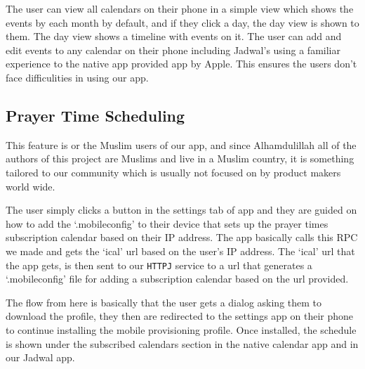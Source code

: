 The user can view all calendars on their phone in a simple view which shows the events by each month by default, and if they click a day, the day view is shown to them. The day view shows a timeline with events on it. The user can add and edit events to any calendar on their phone including Jadwal's using a familiar experience to the native app provided app by Apple. This ensures the users don't face difficulities in using our app.

\subsection{Prayer Time Scheduling}
\label{subsec:schedule-prayer-times}
This feature is or the Muslim users of our app, and since Alhamdulillah all of the authors of this project are Muslims and live in a Muslim country, it is something tailored to our community which is usually not focused on by product makers world wide.

The user simply clicks a button in the settings tab of app and they are guided on how to add the `.mobileconfig' to their device that sets up the prayer times subscription calendar based on their IP address. The app basically calls this RPC we made and gets the `ical' url based on the user's IP address. The `ical' url that the app gets, is then sent to our \texttt{HTTPJ} service to a url that generates a `.mobileconfig' file for adding a subscription calendar based on the url provided.

The flow from here is basically that the user gets a dialog asking them to download the profile, they then are redirected to the settings app on their phone to continue installing the mobile provisioning profile. Once installed, the schedule is shown under the subscribed calendars section in the native calendar app and in our Jadwal app.

